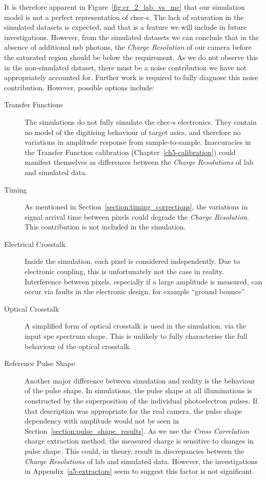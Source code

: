 It is therefore apparent in Figure~\ref{fig:cr_2_lab_vs_mc} that our simulation model is not a perfect representation of \gls{chec-s}. The lack of saturation in the simulated datasets is expected, and that is a feature we will include in future investigations. However, from the simulated datasets we can conclude that in the absence of additional \gls{nsb} photons, the \textit{Charge Resolution} of our camera before the saturated region should be below the requirement. As we do not observe this in the non-simulated dataset, there must be a noise contribution we have not appropriately accounted for. Further work is required to fully diagnose this noise contribution. However, possible options include:
\begin{description}
\item [Transfer Functions] The simulations do not fully simulate the \gls{chec-s} electronics. They contain no model of the digitising behaviour of \gls{target} \glspl{asic}, and therefore no variations in amplitude response from sample-to-sample. Inaccuracies in the Transfer Function calibration (Chapter~\ref{ch5-calibration}) could manifest themselves as differences between the \textit{Charge Resolutions} of lab and simulated data.
\item [Timing] As mentioned in Section~\ref{section:timing_corrections}, the variations in signal arrival time between pixels could degrade the \textit{Charge Resolution}. This contribution is not included in the simulation.
\item [Electrical Crosstalk] Inside the simulation, each pixel is considered independently. Due to electronic coupling, this is unfortunately not the case in reality. Interference between pixels, especially if a large amplitude is measured, can occur via faults in the electronic design, for example ``ground bounce''.
\item [Optical Crosstalk] A simplified form of optical crosstalk is used in the simulation, via the input \gls{spe} spectrum shape. This is unlikely to fully characterise the full behaviour of the optical crosstalk.
\item [Reference Pulse Shape] Another major difference between simulation and reality is the behaviour of the pulse shape. In simulations, the pulse shape at all illuminations is constructed by the superposition of the individual photoelectron pulses. If that description was appropriate for the real camera, the pulse shape dependency with amplitude would not be seen in Section~\ref{section:pulse_shape_results}. As we use the \textit{Cross Correlation} charge extraction method, the measured charge is sensitive to changes in pulse shape. This could, in theory, result in discrepancies between the \textit{Charge Resolutions} of lab and simulated data. However, the investigations in Appendix~\ref{a5-extractors} seem to suggest this factor is not significant.
\end{description}

